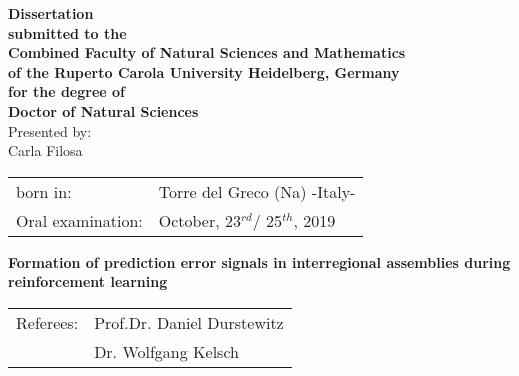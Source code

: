 \thispagestyle{empty}

\vspace*{1cm}

\begin{center}
{\textbf{Dissertation\\submitted to the\\Combined Faculty of Natural Sciences and Mathematics\\of the Ruperto Carola University Heidelberg, Germany\\for the degree of\\Doctor of Natural Sciences}}\\
\vspace{10cm}
Presented by:\\ Carla Filosa\\
\vspace{1cm}
\begin{tabular}{ll}
born in: & Torre del Greco (Na) -Italy-\\
Oral examination: &  October, 23$^{rd}$/ 25$^{th}$, 2019\\
\end{tabular}
\end{center}
\clearpage
\thispagestyle{empty}

\begin{center}
\vspace*{3cm}
{\Huge \textbf{Formation of prediction error signals in interregional assemblies during reinforcement learning}}

\vspace*{12cm}

\begin{tabular}{ll}
Referees: & Prof.Dr. Daniel Durstewitz \\
&  Dr. Wolfgang Kelsch \\
\end{tabular}
\end{center}
\afterpage{\blankpage}




